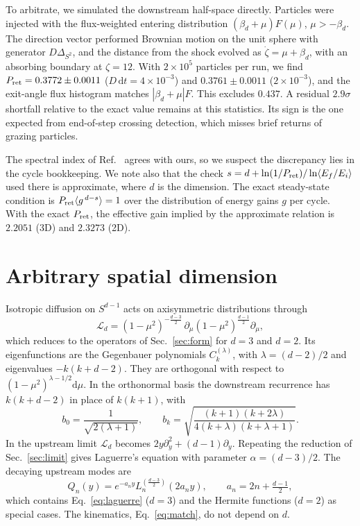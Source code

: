 \documentclass[aps,prd,twocolumn,superscriptaddress,nofootinbib,floatfix]{revtex4-2}
\newcommand{\bd}{\beta_d}
\newcommand{\dd}{\mathrm{d}}
\begin{document}
To arbitrate, we simulated the downstream half-space directly. Particles were injected with the flux-weighted
entering distribution $(\bd+\mu)F(\mu)$, $\mu>-\bd$. The direction vector performed Brownian motion on the unit
sphere with generator $D\Delta_{S^2}$, and the distance from the shock evolved as $\dot\zeta=\mu+\bd$, with an
absorbing boundary at $\zeta=12$. With $2\times10^5$ particles per run, we find $P_{\rm ret}=0.3772\pm0.0011$
($D\,\dd t=4\times10^{-3}$) and $0.3761\pm0.0011$ ($2\times10^{-3}$), and the exit-angle flux histogram matches
$|\bd+\mu|F$. This excludes $0.437$. A residual $2.9\sigma$ shortfall relative to the exact value remains at this
statistics. Its sign is the one expected from end-of-step crossing detection, which misses brief returns of
grazing particles.

The spectral index of Ref.~\cite{Achterberg2001} agrees with ours, so we suspect the discrepancy lies in the
cycle bookkeeping. We note also that the check $s=d+\ln(1/P_{\rm ret})/\ln\langle E_f/E_i\rangle$ used there is
approximate, where $d$ is the dimension. The exact steady-state condition is
$P_{\rm ret}\langle g^{\,d-s}\rangle=1$ over the distribution of energy gains $g$ per cycle. With the exact
$P_{\rm ret}$, the effective gain implied by the approximate relation is $2.2051$ (3D) and $2.3273$ (2D).

\section{Arbitrary spatial dimension}
\label{sec:dim}

Isotropic diffusion on $S^{d-1}$ acts on axisymmetric distributions through
\begin{equation}
\mathcal{L}_d=(1-\mu^2)^{-\frac{d-3}{2}}\,\partial_\mu(1-\mu^2)^{\frac{d-1}{2}}\partial_\mu ,
\end{equation}
which reduces to the operators of Sec.~\ref{sec:form} for $d=3$ and $d=2$. Its eigenfunctions are the Gegenbauer
polynomials $C_k^{(\lambda)}$, with $\lambda=(d-2)/2$ and eigenvalues $-k(k+d-2)$. They are orthogonal with
respect to $(1-\mu^2)^{\lambda-1/2}\dd\mu$. In the orthonormal basis the downstream recurrence has $k(k+d-2)$ in
place of $k(k+1)$, with
\begin{equation}
b_0=\frac{1}{\sqrt{2(\lambda+1)}},\qquad b_k=\sqrt{\frac{(k+1)(k+2\lambda)}{4(k+\lambda)(k+\lambda+1)}} .
\end{equation}
In the upstream limit $\mathcal{L}_d$ becomes $2y\partial_y^2+(d-1)\partial_y$. Repeating the reduction of
Sec.~\ref{sec:limit} gives Laguerre's equation with parameter $\alpha=(d-3)/2$. The decaying upstream modes are
\begin{equation}
Q_n(y)=e^{-a_ny}L_n^{(\frac{d-3}{2})}(2a_ny),\qquad a_n=2n+\tfrac{d-1}{2},
\label{eq:lagd}
\end{equation}
which contains Eq.~\eqref{eq:laguerre} ($d=3$) and the Hermite functions ($d=2$) as special cases. The kinematics,
Eq.~\eqref{eq:match}, do not depend on $d$.
\end{document}
